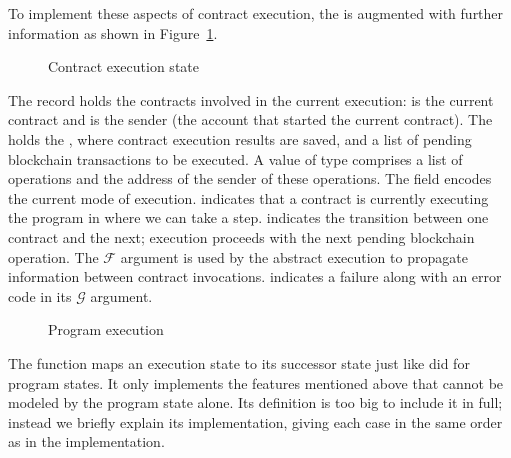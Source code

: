To implement these aspects of contract execution, the 
is augmented with further information as shown in Figure~\ref{fig:contract-execution-state}.
\begin{figure}[tp]
  \ConcretePrgRunning
  \ConcreteTransaction
  \ConcreteRunMode
  \ConcreteExecState
  \caption{Contract execution state}
  \label{fig:contract-execution-state}
\end{figure}
The record  holds the contracts involved in the current
execution:  is the current contract and  is
the sender (the account that started the current contract).
The  holds the , where contract execution results are saved,
and a list of pending blockchain transactions to be executed. A value
of type  comprises a list of operations and the
address of the sender of these operations.
The field  encodes the current mode of
execution.  indicates that a contract is currently executing
the program in  where we can take a step. 
indicates the transition between one contract and the next; execution
proceeds with the next pending blockchain operation. The $\mathcal{F}$
argument is used by the abstract execution to propagate information
between contract invocations.  indicates a failure along
with an error code in its $\mathcal{G}$ argument.

\begin{figure}[tp]
  \ConcreteExecStepProgram
  \caption{Program execution}
  \label{fig:exec-step-1}
\end{figure}
The function {\ConcreteExecStep} maps an execution state to its successor state
just like  did for program states.
It only implements the features mentioned above that cannot be modeled
by the program state alone.
Its definition is too big to include it in full; instead
we briefly explain its implementation, giving each case in the same
order as in the implementation.

